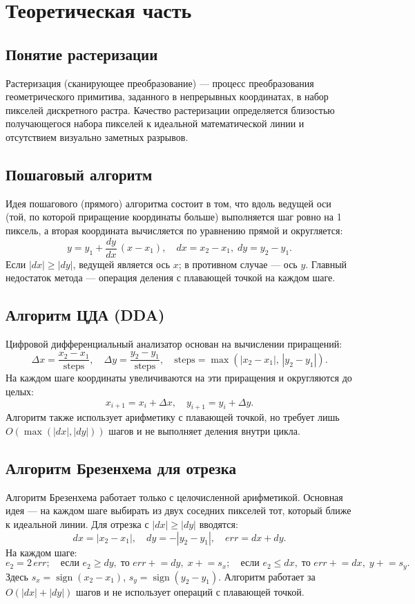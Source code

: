 \documentclass[a4paper,14pt]{extarticle}
\begin{document}
\section{Теоретическая часть}

\subsection{Понятие растеризации}
Растеризация (сканирующее преобразование) — процесс преобразования геометрического примитива, заданного в непрерывных координатах, в набор пикселей дискретного растра. Качество растеризации определяется близостью получающегося набора пикселей к идеальной математической линии и отсутствием визуально заметных разрывов.

\subsection{Пошаговый алгоритм}
Идея пошагового (прямого) алгоритма состоит в том, что вдоль ведущей оси (той, по которой приращение координаты больше) выполняется шаг ровно на 1 пиксель, а вторая координата вычисляется по уравнению прямой и округляется:
\[
y = y_1 + \frac{dy}{dx}\,(x - x_1), \quad dx = x_2 - x_1,\; dy = y_2 - y_1.
\]
Если $|dx| \ge |dy|$, ведущей является ось $x$; в противном случае — ось $y$. Главный недостаток метода — операция деления с плавающей точкой на каждом шаге.

\subsection{Алгоритм ЦДА (DDA)}
Цифровой дифференциальный анализатор основан на вычислении приращений:
\[
\Delta x = \frac{x_2-x_1}{\mathrm{steps}},\quad \Delta y = \frac{y_2-y_1}{\mathrm{steps}},\quad \mathrm{steps} = \max(|x_2-x_1|,\,|y_2-y_1|).
\]
На каждом шаге координаты увеличиваются на эти приращения и округляются до целых:
\[
x_{i+1} = x_i + \Delta x,\quad y_{i+1} = y_i + \Delta y.
\]
Алгоритм также использует арифметику с плавающей точкой, но требует лишь $O(\max(|dx|,|dy|))$ шагов и не выполняет деления внутри цикла.

\subsection{Алгоритм Брезенхема для отрезка}
Алгоритм Брезенхема работает только с целочисленной арифметикой. Основная идея — на каждом шаге выбирать из двух соседних пикселей тот, который ближе к идеальной линии. Для отрезка с $|dx| \ge |dy|$ вводятся:
\[
dx = |x_2 - x_1|,\quad dy = -|y_2 - y_1|,\quad err = dx + dy.
\]
На каждом шаге:
\[
e_2 = 2\,err;\quad
\text{если } e_2 \ge dy,\; \text{то } err \mathrel{+}= dy,\; x \mathrel{+}= s_x;\quad
\text{если } e_2 \le dx,\; \text{то } err \mathrel{+}= dx,\; y \mathrel{+}= s_y.
\]
Здесь $s_x = \operatorname{sign}(x_2-x_1)$, $s_y = \operatorname{sign}(y_2-y_1)$. Алгоритм работает за $O(|dx|+|dy|)$ шагов и не использует операций с плавающей точкой.
\end{document}

